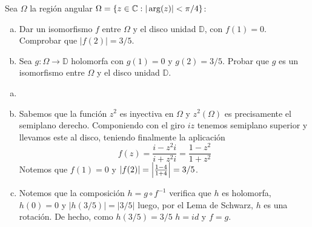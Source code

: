 \documentclass[twoside]{article}
\begin{document}
\newpage
\begin{ejercicio}{8}
Sea $\Omega$ la región angular $\Omega=\{ z\in \mathbb{C} : |\arg(z)| < \pi /4 \}$:
\begin{enumerate}[a)]
\item Dar un isomorfismo $f$ entre $\Omega $ y el disco unidad $\mathbb{D}$, con $f(1)=0$.
Comprobar que $|f(2)|=3/5$.
\item  Sea $g\colon \Omega\to \mathbb{D}$ holomorfa con $g(1)=0$ y  $g(2)=3/5$. Probar que $g$ es un 
isomorfismo entre $\Omega $ y el disco unidad $\mathbb{D}$.
\end{enumerate}
\end{ejercicio}
\begin{solucion}
\begin{enumerate}[a)]
\item[]
\item Sabemos que la función $z^2$ es inyectiva en $\Omega$ y $z^2(\Omega)$ es precisamente el semiplano derecho. Componiendo con el giro $iz$ tenemos semiplano superior y llevamos este al disco, teniendo finalmente la aplicación
$$
f(z) = \frac{i-z^2i}{i+z^2i} = \frac{1-z^2}{1+z^2}
$$
Notemos que $f(1)=0$ y $|f(2)|= \left\lvert\frac{1-4}{1+4}\right\rvert = 3/5$.
\item Notemos que la composición $h = g \circ  f^{-1}$ verifica que $h$ es holomorfa, $h(0)=0$ y $|h(3/5)| = |3/5|$ luego, por el Lema de Schwarz, $h$ es una rotación. De hecho, como $h(3/5)=3/5$ $h=id$ y $f=g$.
\end{enumerate}
\end{solucion}

\newpage
\end{document}
